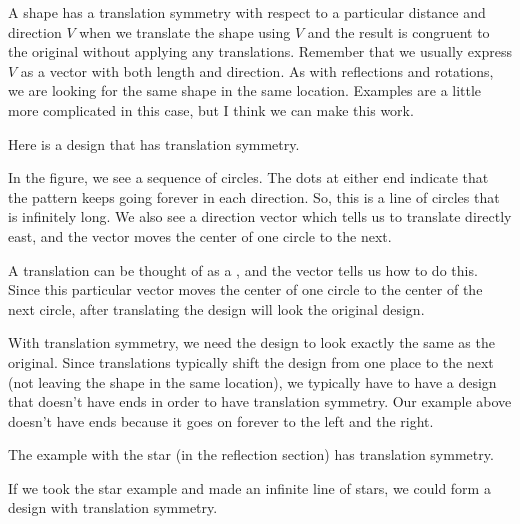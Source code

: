 \documentclass{ximera}
\begin{document}
A shape has a translation symmetry with respect to a particular distance and direction $V$ when we translate the shape using $V$ and the result is congruent to the original without applying any translations. Remember that we usually express $V$ as a vector with both length and direction. As with reflections and rotations, we are looking for the same shape in the same location. Examples are a little more complicated in this case, but I think we can make this work.

\begin{example}
Here is a design that has translation symmetry.
\begin{image}
\end{image}
In the figure, we see a sequence of circles. The dots at either end indicate that the pattern keeps going forever in each direction. So, this is a line of circles that is infinitely long. We also see a direction vector which tells us to translate directly east, and the vector moves the center of one circle to the next.

A translation can be thought of as a  , and the vector tells us how to do this. Since this particular vector moves the center of one circle to the center of the next circle, after translating the design will look  the original design.

\end{example}
With translation symmetry, we need the design to look exactly the same as the original. Since translations typically shift the design from one place to the next (not leaving the shape in the same location), we typically have to have a design that doesn't have ends in order to have translation symmetry. Our example above doesn't have ends because it goes on forever to the left and the right.

\begin{question}
The example with the star (in the reflection section) has translation symmetry.
\begin{multipleChoice}
\end{multipleChoice}

If we took the star example and made  an infinite line of stars, we could form a design with translation symmetry.
\begin{multipleChoice}
\end{multipleChoice}
\end{question}
\end{document}

